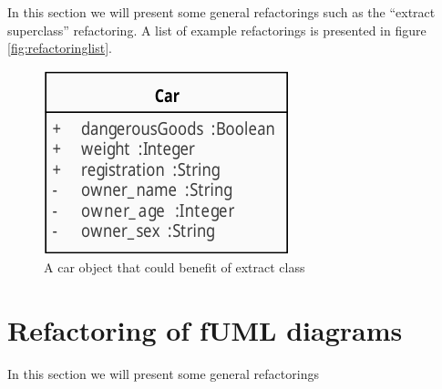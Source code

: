 \documentclass{llncs}
\begin{document}
In this section we will present some general refactorings such as the ``extract superclass'' refactoring. A list of example refactorings
is presented in figure \ref{fig:refactoringlist}.




\begin{figure}[ht]
 \centering
 \includegraphics{images/ComplexCar-class_diagram.pdf}
 \caption{A car object that could benefit of extract class}
 \label{fig:complexcar}
\end{figure}


\section{Refactoring of fUML diagrams}
\label{sec:fuml-refactoring}
In this section we will present some general refactorings
\end{document}
